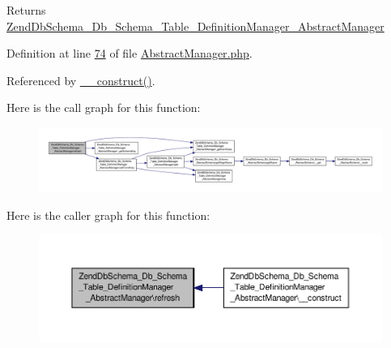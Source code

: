 \begin{DoxyReturn}{Returns}
\hyperlink{classZendDbSchema__Db__Schema__Table__DefinitionManager__AbstractManager}{Zend\-Db\-Schema\-\_\-\-Db\-\_\-\-Schema\-\_\-\-Table\-\_\-\-Definition\-Manager\-\_\-\-Abstract\-Manager} 
\end{DoxyReturn}


Definition at line \hyperlink{AbstractManager_8php_source_l00074}{74} of file \hyperlink{AbstractManager_8php_source}{Abstract\-Manager.\-php}.



Referenced by \hyperlink{AbstractManager_8php_source_l00062}{\-\_\-\-\_\-construct()}.



Here is the call graph for this function\-:\nopagebreak
\begin{figure}[H]
\begin{center}
\leavevmode
\includegraphics[width=350pt]{classZendDbSchema__Db__Schema__Table__DefinitionManager__AbstractManager_a7503e344823c2a1e1e3beb80b8541116_cgraph}
\end{center}
\end{figure}




Here is the caller graph for this function\-:\nopagebreak
\begin{figure}[H]
\begin{center}
\leavevmode
\includegraphics[width=350pt]{classZendDbSchema__Db__Schema__Table__DefinitionManager__AbstractManager_a7503e344823c2a1e1e3beb80b8541116_icgraph}
\end{center}
\end{figure}


